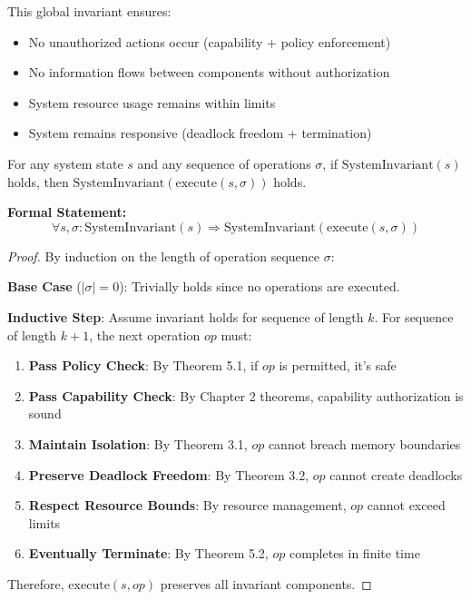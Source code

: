 This global invariant ensures:
\begin{itemize}
\item No unauthorized actions occur (capability + policy enforcement)
\item No information flows between components without authorization
\item System resource usage remains within limits
\item System remains responsive (deadlock freedom + termination)
\end{itemize}

\begin{theorem}
\label{thm:system-invariant-preservation}
For any system state $s$ and any sequence of operations $\sigma$, if $\text{SystemInvariant}(s)$ holds, then $\text{SystemInvariant}(\text{execute}(s, \sigma))$ holds.
\end{theorem}

\textbf{Formal Statement:}
$$\forall s, \sigma: \text{SystemInvariant}(s) \Rightarrow \text{SystemInvariant}(\text{execute}(s, \sigma))$$

\begin{proof}
By induction on the length of operation sequence $\sigma$:

\textbf{Base Case} ($|\sigma| = 0$): Trivially holds since no operations are executed.

\textbf{Inductive Step}: Assume invariant holds for sequence of length $k$. For sequence of length $k+1$, the next operation $op$ must:
\begin{enumerate}
\item \textbf{Pass Policy Check}: By Theorem 5.1, if $op$ is permitted, it's safe
\item \textbf{Pass Capability Check}: By Chapter 2 theorems, capability authorization is sound
\item \textbf{Maintain Isolation}: By Theorem 3.1, $op$ cannot breach memory boundaries
\item \textbf{Preserve Deadlock Freedom}: By Theorem 3.2, $op$ cannot create deadlocks
\item \textbf{Respect Resource Bounds}: By resource management, $op$ cannot exceed limits
\item \textbf{Eventually Terminate}: By Theorem 5.2, $op$ completes in finite time
\end{enumerate}

Therefore, $\text{execute}(s, op)$ preserves all invariant components.
\end{proof}

